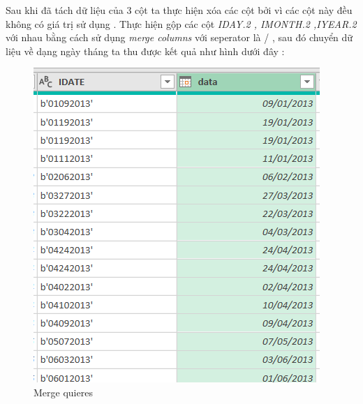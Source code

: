 \begin{itemize}
\begin{figure}[!h]
\begin{center}
\end{center}
   \end{figure}
   Sau khi đã tách dữ liệu của 3 cột ta thực hiện xóa các cột bởi vì các cột này đều không có giá trị sử dụng . Thực hiện gộp các cột \textit{ IDAY.2 , IMONTH.2 ,IYEAR.2  }  với nhau bằng cách sử dụng\textit{ merge columns} với seperator là / , sau đó chuyển dữ liệu về dạng ngày tháng ta thu được kết quả như hình dưới đây :
    \begin{figure}[!h]
                \begin{center}
                \includegraphics[scale = 0.8]{HONG/3.png}
              \caption{Merge quieres}
         

\end{center}
\end{figure}
\end{itemize}
